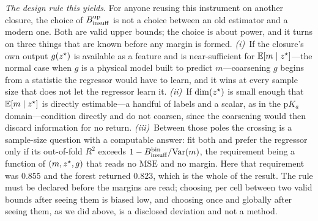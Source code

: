 \emph{The design rule this yields.} For anyone reusing this instrument on another closure, the
choice of $B_{\mathrm{insuff}}^{\mathrm{up}}$ is not a choice between an old estimator and a modern one. Both
are valid upper bounds; the choice is about power, and it turns on three things that are known
before any margin is formed. \emph{(i)}~If the closure's own output $g(z^\star)$ is available as a
feature and is near-sufficient for $\mathbb{E}[m\mid z^\star]$---the normal case when $g$ is a physical model
built to predict $m$---coarsening $g$ begins from a statistic the regressor would have to learn, and
it wins at every sample size that does not let the regressor learn it. \emph{(ii)}~If $\dim(z^\star)$
is small enough that $\mathbb{E}[m\mid z^\star]$ is directly estimable---a handful of labels and a scalar, as
in the $\mathrm pK_a$ domain---condition directly and do not coarsen, since the coarsening would then
discard information for no return. \emph{(iii)}~Between those poles the crossing is a sample-size
question with a computable answer: fit both and prefer the regressor only if its out-of-fold $R^2$
exceeds $1-B_{\mathrm{insuff}}^{\mathrm{bin}}/\mathrm{Var}(m)$, the requirement being a function of $(m,z^\star,g)$ that
reads no $\mathrm{MSE}$ and no margin. Here that requirement was $0.855$ and the forest returned
$0.823$, which is the whole of the result. The rule must be declared before the margins are read;
choosing per cell between two valid bounds after seeing them is biased low, and choosing once and
globally after seeing them, as we did above, is a disclosed deviation and not a method.

